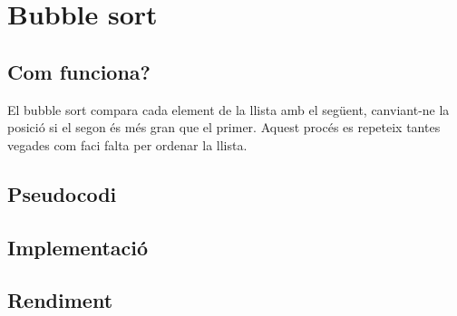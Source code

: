 \chapter{Bubble sort}

\section{Com funciona?}
El bubble sort compara cada element de la llista amb el següent, canviant-ne la posició si el segon és més gran que el primer.
Aquest procés es repeteix tantes vegades com faci falta per ordenar la llista.
\section{Pseudocodi}
\section{Implementació}

\section{Rendiment}
